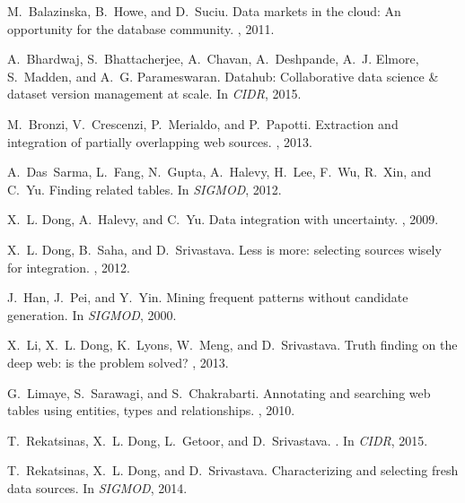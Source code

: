 \documentclass{vldb}
\begin{document}
{\scriptsize
\begin{thebibliography}{10}

M.~Balazinska, B.~Howe, and D.~Suciu.
\newblock Data markets in the cloud: An opportunity for the database community.
, 2011.

A.~Bhardwaj, S.~Bhattacherjee, A.~Chavan, A.~Deshpande, A.~J. Elmore,
  S.~Madden, and A.~G. Parameswaran.
\newblock Datahub: Collaborative data science \& dataset version management at
  scale.
\newblock In {\em CIDR}, 2015.

M.~Bronzi, V.~Crescenzi, P.~Merialdo, and P.~Papotti.
\newblock Extraction and integration of partially overlapping web sources.
, 2013.

A.~Das~Sarma, L.~Fang, N.~Gupta, A.~Halevy, H.~Lee, F.~Wu, R.~Xin, and C.~Yu.
\newblock Finding related tables.
\newblock In {\em SIGMOD}, 2012.

X.~L. Dong, A.~Halevy, and C.~Yu.
\newblock Data integration with uncertainty.
, 2009.

X.~L. Dong, B.~Saha, and D.~Srivastava.
\newblock Less is more: selecting sources wisely for integration.
, 2012.

J.~Han, J.~Pei, and Y.~Yin.
\newblock Mining frequent patterns without candidate generation.
\newblock In {\em SIGMOD}, 2000.

X.~Li, X.~L. Dong, K.~Lyons, W.~Meng, and D.~Srivastava.
\newblock Truth finding on the deep web: is the problem solved?
, 2013.

G.~Limaye, S.~Sarawagi, and S.~Chakrabarti.
\newblock Annotating and searching web tables using entities, types and
  relationships.
, 2010.

T.~Rekatsinas, X.~L. Dong, L.~Getoor, and D.~Srivastava.
.
\newblock In {\em CIDR}, 2015.

T.~Rekatsinas, X.~L. Dong, and D.~Srivastava.
\newblock Characterizing and selecting fresh data sources.
\newblock In {\em SIGMOD}, 2014.


\end{thebibliography}}
\end{document}
